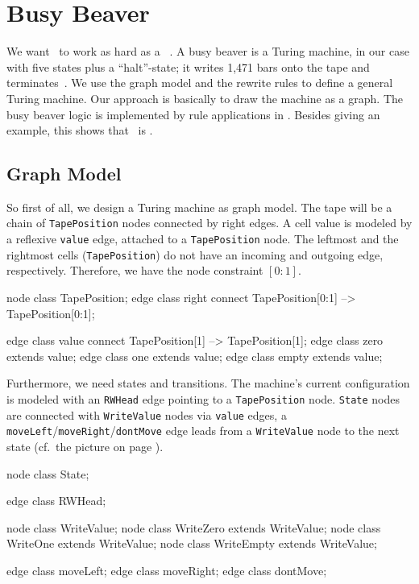 \section{Busy Beaver}
We want \GrG\ to work as hard as a ~\cite{Kro:07,Dew:84}.
A busy beaver is a Turing machine, in our case with five states plus a ``halt''-state; it writes 1,471 bars onto the tape and terminates~\cite{MB:00}. 
We use the graph model and the rewrite rules to define a general Turing machine.
Our approach is basically to draw the machine as a graph.
The busy beaver logic is implemented by rule applications in \GrShell.
Besides giving an example, this shows that \GrG\ is .

\subsection{Graph Model}
So first of all, we design a Turing machine as graph model. 
The tape will be a chain of \texttt{TapePosition} nodes connected by right edges. 
A cell value is modeled by a reflexive \texttt{value} edge, attached to a \texttt{TapePosition} node.
The leftmost and the rightmost cells (\texttt{TapePosition}) do not have an incoming and outgoing edge, respectively.
Therefore, we have the node constraint $[0:1]$.

\begin{grgen}[firstnumber=last]
node class TapePosition;
edge class right
  connect TapePosition[0:1] --> TapePosition[0:1];

edge class value
  connect TapePosition[1] --> TapePosition[1];
edge class zero  extends value;
edge class one   extends value;
edge class empty extends value;
\end{grgen}

Furthermore, we need states and transitions.
The machine's current configuration is modeled with an \texttt{RWHead} edge pointing to a \texttt{TapePosition} node.
\texttt{State} nodes are connected with \texttt{WriteValue} nodes via \texttt{value} edges, a \texttt{moveLeft}/\texttt{moveRight}/\texttt{dontMove} edge leads from a \texttt{WriteValue} node to the next state (cf.~the picture on page \pageref{fig:bbstart}).

\begin{grgen}[firstnumber=last]
node class State;

edge class RWHead;

node class WriteValue;
node class WriteZero extends WriteValue;
node class WriteOne extends WriteValue;
node class WriteEmpty extends WriteValue;

edge class moveLeft;
edge class moveRight;
edge class dontMove;
\end{grgen}

